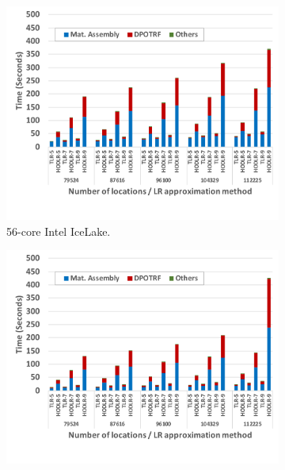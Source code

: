 \documentclass[conference]{IEEEtran}
\begin{document}
\begin{figure}
\centering
      \begin{subfigure}[b]{0.43\textwidth}
     \includegraphics[width=1\textwidth]{./figures/lr-performance-qaysar.pdf}
     \caption{56-core Intel IceLake.}
      \label{fig:tlrhodlr-qaysar}
    \end{subfigure}
     \begin{subfigure}[b]{0.43\textwidth}
     \includegraphics[width=1\textwidth]{./figures/lr-performance-kanary.pdf}

\end{subfigure}
\end{figure}
\end{document}
